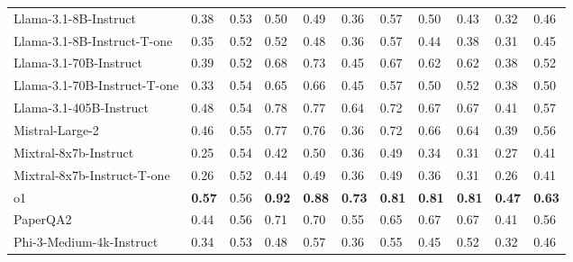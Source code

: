 \begin{tabular}{lllllllllll}
Llama-3.1-8B-Instruct & 0.38 & 0.53 & 0.50 & 0.49 & 0.36 & 0.57 & 0.50 & 0.43 & 0.32 & 0.46 \\
Llama-3.1-8B-Instruct-T-one & 0.35 & 0.52 & 0.52 & 0.48 & 0.36 & 0.57 & 0.44 & 0.38 & 0.31 & 0.45 \\
Llama-3.1-70B-Instruct & 0.39 & 0.52 & 0.68 & 0.73 & 0.45 & 0.67 & 0.62 & 0.62 & 0.38 & 0.52 \\
Llama-3.1-70B-Instruct-T-one & 0.33 & 0.54 & 0.65 & 0.66 & 0.45 & 0.57 & 0.50 & 0.52 & 0.38 & 0.50 \\
Llama-3.1-405B-Instruct & 0.48 & 0.54 & 0.78 & 0.77 & 0.64 & 0.72 & 0.67 & 0.67 & 0.41 & 0.57 \\
Mistral-Large-2 & 0.46 & 0.55 & 0.77 & 0.76 & 0.36 & 0.72 & 0.66 & 0.64 & 0.39 & 0.56 \\
Mixtral-8x7b-Instruct & 0.25 & 0.54 & 0.42 & 0.50 & 0.36 & 0.49 & 0.34 & 0.31 & 0.27 & 0.41 \\
Mixtral-8x7b-Instruct-T-one & 0.26 & 0.52 & 0.44 & 0.49 & 0.36 & 0.49 & 0.36 & 0.31 & 0.26 & 0.41 \\
o1 & \textbf{0.57} & 0.56 & \textbf{0.92} & \textbf{0.88} & \textbf{0.73} & \textbf{0.81} & \textbf{0.81} & \textbf{0.81} & \textbf{0.47} & \textbf{0.63} \\
PaperQA2 & 0.44 & 0.56 & 0.71 & 0.70 & 0.55 & 0.65 & 0.67 & 0.67 & 0.41 & 0.56 \\
Phi-3-Medium-4k-Instruct & 0.34 & 0.53 & 0.48 & 0.57 & 0.36 & 0.55 & 0.45 & 0.52 & 0.32 & 0.46 \\
\bottomrule
\end{tabular}
